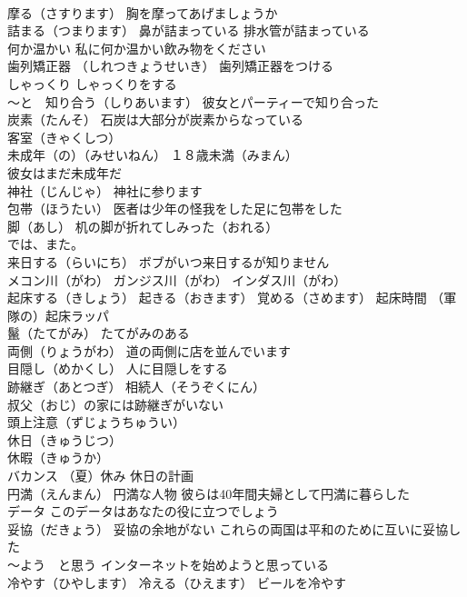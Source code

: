 \documentclass[8pt]{extreport}
\begin{document}
\begin{CJK}{UTF8}{min}
\\	摩る（さすります） 胸を摩ってあげましょうか
\\	詰まる（つまります） 鼻が詰まっている 排水管が詰まっている
\\	何か温かい 私に何か温かい飲み物をください
\\	歯列矯正器 （しれつきょうせいき） 歯列矯正器をつける
\\	しゃっくり しゃっくりをする
\\	～と　知り合う（しりあいます） 彼女とパーティーで知り合った
\\	炭素（たんそ） 石炭は大部分が炭素からなっている
\\	客室（きゃくしつ）
\\	未成年（の）（みせいねん） １８歳未満（みまん） 
\\	彼女はまだ未成年だ
\\	神社（じんじゃ） 神社に参ります
\\	包帯（ほうたい） 医者は少年の怪我をした足に包帯をした
\\	脚（あし） 机の脚が折れてしみった（おれる）
\\	では、また。
\\	来日する（らいにち） ボブがいつ来日するが知りません
\\	メコン川（がわ） ガンジス川（がわ） インダス川（がわ）
\\	起床する（きしょう） 起きる（おきます） 覚める（さめます） 起床時間 （軍隊の）起床ラッパ
\\	鬣（たてがみ） たてがみのある
\\	両側（りょうがわ） 道の両側に店を並んでいます
\\	目隠し（めかくし） 人に目隠しをする
\\	跡継ぎ（あとつぎ） 相続人（そうぞくにん）
\\	叔父（おじ）の家には跡継ぎがいない
\\	頭上注意（ずじょうちゅうい）
\\	休日（きゅうじつ）
\\	休暇（きゅうか）
\\	バカンス （夏）休み 休日の計画
\\	円満（えんまん） 円満な人物 彼らは40年間夫婦として円満に暮らした
\\	データ このデータはあなたの役に立つでしょう
\\	妥協（だきょう） 妥協の余地がない これらの両国は平和のために互いに妥協した
\\	～よう　と思う インターネットを始めようと思っている
\\	冷やす（ひやします） 冷える（ひえます） ビールを冷やす

\end{CJK}
\end{document}
